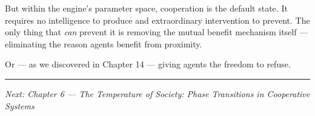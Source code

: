 But within the engine's parameter space, cooperation is the default state. It requires no intelligence to produce and extraordinary intervention to prevent. The only thing that \emph{can} prevent it is removing the mutual benefit mechanism itself --- eliminating the reason agents benefit from proximity.

Or --- as we discovered in Chapter 14 --- giving agents the freedom to refuse.

\begin{center}\rule{0.5\linewidth}{0.5pt}\end{center}

\emph{Next: Chapter 6 --- The Temperature of Society: Phase Transitions in Cooperative Systems}
